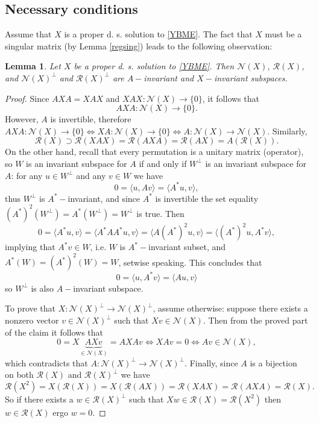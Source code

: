 \documentclass{article}
\newtheorem{lemma}{Lemma}[section]
\theoremstyle{definition}\newtheorem{example}{Example}[section]
\def\N{{\mathcal{N}}}
\def\R{{\mathcal{R}}}
\begin{document}
	\subsection{Necessary conditions}
	
	Assume that $X$ is a proper d. s. solution to \eqref{YBME}. The fact that $X$ must be a singular matrix (by Lemma \ref{regsing}) leads  to the following observation:
	\begin{lemma}\label{propper}
		Let $X$ be a proper d. s. solution to \eqref{YBME}. Then $\N(X)$, $\R(X)$, and $\N(X)^\perp$ and $\R(X)^\perp$ are $A-$invariant and $X-$invariant subspaces.
	\end{lemma}
	\begin{proof}
		Since $AXA=XAX$ and $XAX:\N(X)\to \{0\}$, it follows that 
		$$AXA:\N(X)\to\{0\}.$$
		However, $A$ is invertible, therefore $AXA:\N(X)\to\{0\}\Leftrightarrow XA:\N(X)\to \{0\}\Leftrightarrow A:\N(X)\to \N(X)$. Similarly,
		$$\R(X)\supset\R(XAX)=\R(AXA)=\R(AX)=A\left(\R(X)\right).$$
		On the other hand, recall that every permutation is a unitary matrix (operator), so $W$ is an invariant subspace for $A$ if and only if $W^\perp$ is an invariant subspace for $A$: for any $u\in W^\perp$ and any $v\in W$ we have
		$$0=\langle u, Av\rangle=\langle A^*u,v\rangle,$$
		thus $W^\perp$ is $A^*-$invariant, and since $A^*$ is invertible the set equality $\left(A^*\right)^2(W^\perp)=A^*(W^\perp)=W^\perp$ is true. Then 
		$$0=\langle A^*u,v\rangle=\langle A^*AA^* u, v\rangle=\langle A\left(A^*\right)^2u, v\rangle=\langle \left(A^*\right)^2u, A^*v\rangle,$$
		implying that $A^*v\in W$, i.e. $W$ is $A^*-$invariant subset, and $A^*(W)=\left(A^*\right)^2(W)=W$, setwise speaking. This concludes that
		$$0=\langle u, A^*v\rangle=\langle Au,v\rangle$$
		so $W^\perp$ is also $A-$invariant subspace.
		
		To prove that $X:\N(X)^\perp\to \N(X)^\perp$, assume otherwise: suppose there exists a nonzero vector $v\in\N(X)^\perp$ such that $Xv\in \N(X)$. Then from the proved part of the claim it follows that
		$$0=X\underbrace{AXv}_{\in\N(X)}=AXAv\Leftrightarrow XAv=0\Leftrightarrow Av\in\N(X),$$
		which contradicts that $A:\N(X)^\perp\to\N(X)^\perp$.
		Finally, since $A$ is a bijection on both $\R(X)$ and $\R(X)^\perp$ we have
		$$\R(X^2)=X\left(\R(X)\right)=X\left(\R(AX)\right)=\R(XAX)=\R(AXA)=\R(X).$$
		So if there exists a $w\in\R(X)^\perp$ such that $Xw\in\R(X)=\R(X^2)$ then $w\in \R(X)$ ergo $w=0$.
	\end{proof}
	
\end{document}
